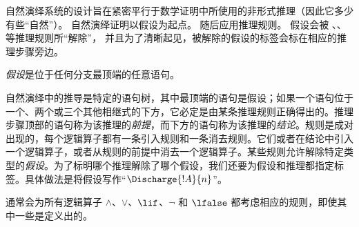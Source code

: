 \documentclass[../../../include/open-logic-section]{subfiles}
\begin{document}
      {}
      {}


\begin{explain}
自然演绎系统的设计旨在紧密平行于数学证明中所使用的非形式推理（因此它多少有些“自然”）。
自然演绎证明以假设为起点。
随后应用推理规则。
假设会被 \Intro{\lnot}、\Intro{\lif}、 等推理规则所“解除”，
并且为了清晰起见，被解除的假设的标签会标在相应的推理步骤旁边。
\end{explain}

\begin{defn}[假设]
\emph{假设}是位于任何分支最顶端的任意语句。
\end{defn}

自然演绎中的推导是特定的语句树，其中最顶端的语句是假设；如果一个语句位于一个、两个或三个其他相继式的下方，它必定是由某条推理规则正确得出的。推理步骤顶部的语句称为该推理的\emph{前提}，而下方的语句称为该推理的\emph{结论}。规则是成对出现的，每个逻辑算子都有一条引入规则和一条消去规则。它们或者在结论中引入一个逻辑算子，或者从规则的前提中消去一个逻辑算子。某些规则允许解除特定类型的\emph{假设}。为了标明哪个推理解除了哪个假设，我们还要为假设和推理都指定标签。具体做法是将假设写作“$\Discharge{!A}{n}$”。


%
	{通常会为所有逻辑算子 $\land$、$\lor$、$\lif$、$\lnot$ 和 $\lfalse$ 都考虑相应的规则，即使其中一些是定义出的。}
\end{document}
